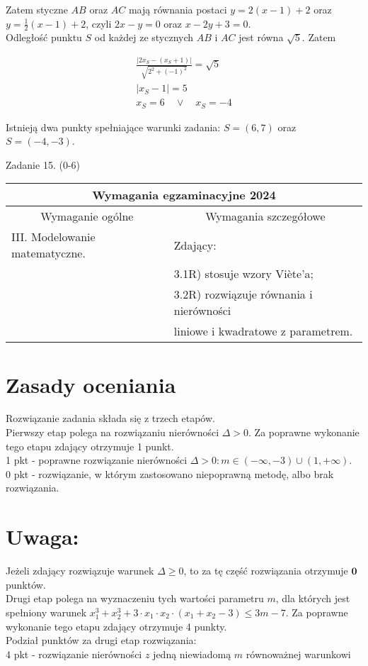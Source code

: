 \documentclass[10pt]{article}
\begin{document}
Zatem styczne $A B$ oraz $A C$ mają równania postaci $y=2(x-1)+2$ oraz $y=\frac{1}{2}(x-1)+2$, czyli $2 x-y=0$ oraz $x-2 y+3=0$.\\
Odległość punktu $S$ od każdej ze stycznych $A B$ i $A C$ jest równa $\sqrt{5}$. Zatem

$$
\begin{gathered}
\frac{\left|2 x_{S}-\left(x_{S}+1\right)\right|}{\sqrt{2^{2}+(-1)^{2}}}=\sqrt{5} \\
\left|x_{S}-1\right|=5 \\
x_{S}=6 \quad \vee \quad x_{S}=-4
\end{gathered}
$$

Istnieją dwa punkty spełniające warunki zadania: $S=(6,7)$ oraz $S=(-4,-3)$.

Zadanie 15. (0-6)

\begin{center}
\begin{tabular}{|l|l|}
\hline
\multicolumn{2}{|c|}{Wymagania egzaminacyjne 2024} \\
\hline
\multicolumn{1}{|c|}{Wymaganie ogólne} & \multicolumn{1}{|c|}{Wymagania szczegółowe} \\
\hline
III. Modelowanie matematyczne. & Zdający: \\
 & 3.1R) stosuje wzory Viète'a; \\
 & 3.2R) rozwiązuje równania i nierówności \\
 & liniowe i kwadratowe z parametrem. \\
\hline
\end{tabular}
\end{center}

\section*{Zasady oceniania}
Rozwiązanie zadania składa się z trzech etapów.\\
Pierwszy etap polega na rozwiązaniu nierówności $\Delta>0$. Za poprawne wykonanie tego etapu zdający otrzymuje 1 punkt.\\
1 pkt - poprawne rozwiązanie nierówności $\Delta>0: m \in(-\infty,-3) \cup(1,+\infty)$.\\
0 pkt - rozwiązanie, w którym zastosowano niepoprawną metodę, albo brak rozwiązania.

\section*{Uwaga:}
Jeżeli zdający rozwiązuje warunek $\Delta \geq 0$, to za tę część rozwiązania otrzymuje $\mathbf{0}$ punktów.\\
Drugi etap polega na wyznaczeniu tych wartości parametru $m$, dla których jest spełniony warunek $x_{1}^{3}+x_{2}^{3}+3 \cdot x_{1} \cdot x_{2} \cdot\left(x_{1}+x_{2}-3\right) \leq 3 m-7$. Za poprawne wykonanie tego etapu zdający otrzymuje 4 punkty.\\
Podział punktów za drugi etap rozwiązania:\\
4 pkt - rozwiązanie nierówności $z$ jedną niewiadomą $m$ równoważnej warunkowi
\end{document}
